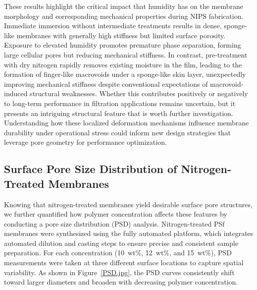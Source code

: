 \documentclass[preprint,12pt,times]{elsarticle}
\begin{document}
These results highlight the critical impact that humidity has on the membrane morphology and corresponding mechanical properties during NIPS fabrication. Immediate immersion without intermediate treatments results in dense, sponge-like membranes with generally high stiffness but limited surface porosity. Exposure to elevated humidity promotes premature phase separation, forming large cellular pores but reducing mechanical stiffness. In contrast, pre-treatment with dry nitrogen rapidly removes existing moisture in the film, leading to the formation of finger-like macrovoids under a sponge-like skin layer, unexpectedly improving mechanical stiffness despite conventional expectations of macrovoid-induced structural weaknesses. Whether this contributes positively or negatively to long-term performance in filtration applications remains uncertain, but it presents an intriguing structural feature that is worth further investigation. Understanding how these localized deformation mechanisms influence membrane durability under operational stress could inform new design strategies that leverage pore geometry for performance optimization. 

\subsection{Surface Pore Size Distribution of Nitrogen-Treated Membranes}
\label{PSD}
Knowing that nitrogen-treated membranes yield desirable surface pore structures, we further quantified how polymer concentration affects these features by conducting a pore size distribution (PSD) analysis. Nitrogen-treated PSf membranes were synthesized using the fully automated platform, which integrates automated dilution and casting steps to ensure precise and consistent sample preparation. For each concentration (10~wt\%, 12~wt\%, and 15~wt\%), PSD measurements were taken at three different surface locations to capture spatial variability. As shown in Figure~\ref{PSD.jpg}, the PSD curves consistently shift toward larger diameters and broaden with decreasing polymer concentration. 
\end{document}
